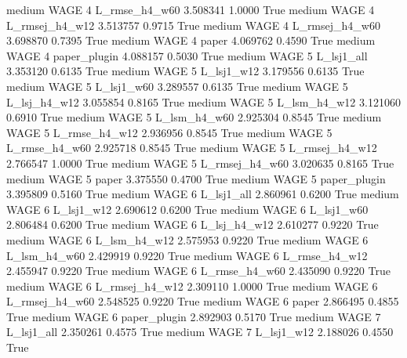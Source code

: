     medium     WAGE                 4  L_rmse_h4_w60   3.508341      1.0000    True
    medium     WAGE                 4 L_rmsej_h4_w12   3.513757      0.9715    True
    medium     WAGE                 4 L_rmsej_h4_w60   3.698870      0.7395    True
    medium     WAGE                 4          paper   4.069762      0.4590    True
    medium     WAGE                 4   paper_plugin   4.088157      0.5030    True
    medium     WAGE                 5     L_lsj1_all   3.353120      0.6135    True
    medium     WAGE                 5     L_lsj1_w12   3.179556      0.6135    True
    medium     WAGE                 5     L_lsj1_w60   3.289557      0.6135    True
    medium     WAGE                 5   L_lsj_h4_w12   3.055854      0.8165    True
    medium     WAGE                 5   L_lsm_h4_w12   3.121060      0.6910    True
    medium     WAGE                 5   L_lsm_h4_w60   2.925304      0.8545    True
    medium     WAGE                 5  L_rmse_h4_w12   2.936956      0.8545    True
    medium     WAGE                 5  L_rmse_h4_w60   2.925718      0.8545    True
    medium     WAGE                 5 L_rmsej_h4_w12   2.766547      1.0000    True
    medium     WAGE                 5 L_rmsej_h4_w60   3.020635      0.8165    True
    medium     WAGE                 5          paper   3.375550      0.4700    True
    medium     WAGE                 5   paper_plugin   3.395809      0.5160    True
    medium     WAGE                 6     L_lsj1_all   2.860961      0.6200    True
    medium     WAGE                 6     L_lsj1_w12   2.690612      0.6200    True
    medium     WAGE                 6     L_lsj1_w60   2.806484      0.6200    True
    medium     WAGE                 6   L_lsj_h4_w12   2.610277      0.9220    True
    medium     WAGE                 6   L_lsm_h4_w12   2.575953      0.9220    True
    medium     WAGE                 6   L_lsm_h4_w60   2.429919      0.9220    True
    medium     WAGE                 6  L_rmse_h4_w12   2.455947      0.9220    True
    medium     WAGE                 6  L_rmse_h4_w60   2.435090      0.9220    True
    medium     WAGE                 6 L_rmsej_h4_w12   2.309110      1.0000    True
    medium     WAGE                 6 L_rmsej_h4_w60   2.548525      0.9220    True
    medium     WAGE                 6          paper   2.866495      0.4855    True
    medium     WAGE                 6   paper_plugin   2.892903      0.5170    True
    medium     WAGE                 7     L_lsj1_all   2.350261      0.4575    True
    medium     WAGE                 7     L_lsj1_w12   2.188026      0.4550    True
